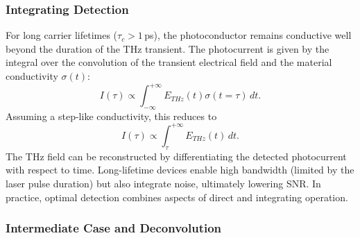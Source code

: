 

\subsubsection{Integrating Detection}
For long carrier lifetimes ($\tau_c > 1$\,\si{\pico \s}), the photoconductor remains conductive well beyond the duration of the THz transient. The photocurrent is given by the integral over the convolution of the transient electrical field and the material conductivity $\sigma(t)$:
\begin{equation}
    I(\tau) \propto \int_{-\infty}^{+\infty} E_{THz}(t)\sigma(t=\tau)\, dt .
    \label{eq_conv_integration_detection}
\end{equation}
Assuming a step-like conductivity, this reduces to
\begin{equation}
    I(\tau) \propto \int_{\tau}^{+\infty} E_{THz}(t)\, dt.
    \label{eq_conv_int_det_2}
\end{equation}
The THz field can be reconstructed by differentiating the detected photocurrent with respect to time. Long-lifetime devices enable high bandwidth (limited by the laser pulse duration) but also integrate noise, ultimately lowering SNR. In practice, optimal detection combines aspects of direct and integrating operation.

\subsubsection{Intermediate Case and Deconvolution}

